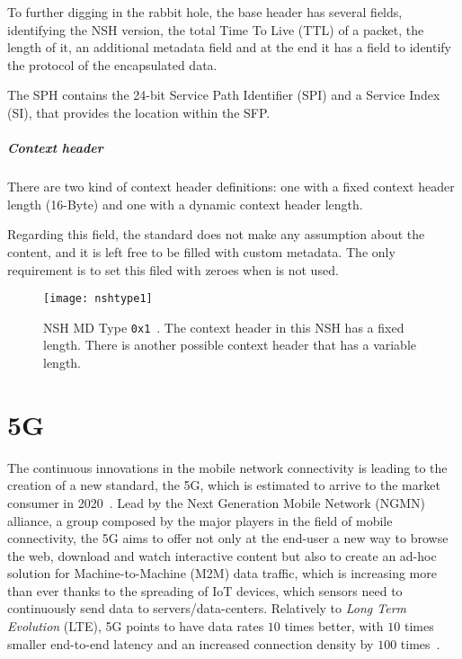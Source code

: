 To further digging in the rabbit hole, the base header has several fields,
identifying the NSH version, the total Time To Live (TTL) of a packet, the
length of it, an additional metadata field and at the end it has a field to
identify the protocol of the encapsulated data.

The SPH contains the 24-bit Service Path Identifier (SPI) and a Service Index
(SI), that provides the location within the SFP.

\subparagraph*{Context header}
There are two kind of context header definitions: one with a fixed context
header length (16-Byte) and one with a dynamic context header length.

\noindent Regarding this field, the standard does not make any assumption about
the content, and it is left free to be filled with custom metadata. The only
requirement is to set this filed with zeroes when is not used.

\begin{figure}[t]
  \centering
  \texttt{[image: nshtype1]}
  \caption[NSH MD Type \texttt{0x1}]{NSH MD Type \texttt{0x1}~\cite{rfc8300}.
    The context header in this NSH has a fixed length. There is another possible
    context header that has a variable length.}
  \label{chap:background:img:nshtype1}
\end{figure}

\section{5G}
The continuous innovations in the mobile network connectivity is leading to the
creation of a new standard, the 5G, which is estimated to arrive to the market
consumer in 2020~\cite{iwamura2015ngmn}. Lead by the Next Generation Mobile
Network (NGMN) alliance, a group composed by the major players in the field of
mobile connectivity, the 5G aims to offer not only at the end-user a new way to
browse the web, download and watch interactive content but also to create an
ad-hoc solution for Machine-to-Machine (M2M) data traffic, which is increasing
more than ever thanks to the spreading of IoT devices, which sensors need to
continuously send data to servers/data-centers. Relatively to \emph{Long Term
  Evolution} (LTE), 5G points to have data rates $10$ times better, with $10$
times smaller end-to-end latency and an increased connection density by $100$
times~\cite{alliance20155g}.


